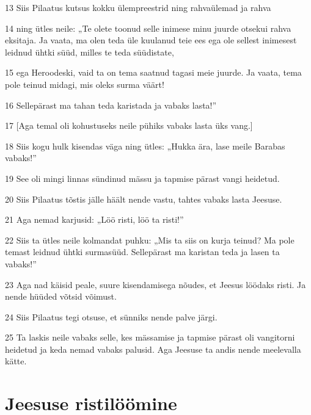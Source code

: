 \par 13 Siis Pilaatus kutsus kokku ülempreestrid ning rahvaülemad ja rahva
\par 14 ning ütles neile: „Te olete toonud selle inimese minu juurde otsekui rahva eksitaja. Ja vaata, ma olen teda üle kuulanud teie ees ega ole sellest inimesest leidnud ühtki süüd, milles te teda süüdistate,
\par 15 ega Heroodeski, vaid ta on tema saatnud tagasi meie juurde. Ja vaata, tema pole teinud midagi, mis oleks surma väärt!
\par 16 Sellepärast ma tahan teda karistada ja vabaks lasta!”
\par 17 [Aga temal oli kohustuseks neile pühiks vabaks lasta üks vang.]
\par 18 Siis kogu hulk kisendas väga ning ütles: „Hukka ära, lase meile Barabas vabaks!”
\par 19 See oli mingi linnas sündinud mässu ja tapmise pärast vangi heidetud.
\par 20 Siis Pilaatus tõstis jälle häält nende vastu, tahtes vabaks lasta Jeesuse.
\par 21 Aga nemad karjusid: „Löö risti, löö ta risti!”
\par 22 Siis ta ütles neile kolmandat puhku: „Mis ta siis on kurja teinud? Ma pole temast leidnud ühtki surmasüüd. Sellepärast ma karistan teda ja lasen ta vabaks!”
\par 23 Aga nad käisid peale, suure kisendamisega nõudes, et Jeesus löödaks risti. Ja nende hüüded võtsid võimust.
\par 24 Siis Pilaatus tegi otsuse, et sünniks nende palve järgi.
\par 25 Ta laskis neile vabaks selle, kes mässamise ja tapmise pärast oli vangitorni heidetud ja keda nemad vabaks palusid. Aga Jeesuse ta andis nende meelevalla kätte.

\section*{Jeesuse ristilöömine}

